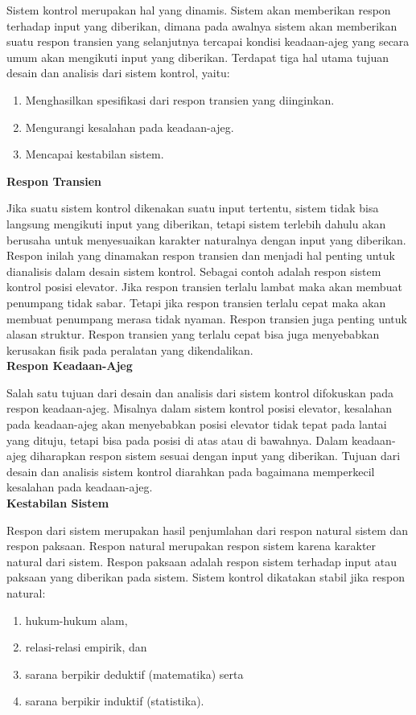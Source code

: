 Sistem kontrol merupakan hal yang dinamis. Sistem akan memberikan respon terhadap input yang diberikan, dimana pada awalnya sistem akan memberikan suatu respon transien yang selanjutnya tercapai kondisi keadaan-ajeg yang secara umum akan mengikuti input yang diberikan. Terdapat tiga hal utama tujuan desain dan analisis dari sistem kontrol, yaitu:

\begin{enumerate}
	\item Menghasilkan spesifikasi dari respon transien yang diinginkan.
	\item Mengurangi kesalahan pada keadaan-ajeg.
	\item Mencapai kestabilan sistem.
\end{enumerate}

\noindent \textbf{Respon Transien}

Jika suatu sistem kontrol dikenakan suatu input tertentu, sistem tidak bisa langsung mengikuti input yang diberikan, tetapi sistem terlebih dahulu akan berusaha untuk menyesuaikan karakter naturalnya dengan input yang diberikan. Respon inilah yang dinamakan respon transien dan menjadi hal penting untuk dianalisis dalam desain sistem kontrol. Sebagai contoh adalah respon sistem kontrol posisi elevator. Jika respon transien terlalu lambat maka akan membuat penumpang tidak sabar. Tetapi jika respon transien terlalu cepat maka akan membuat penumpang merasa tidak nyaman. Respon transien juga penting untuk alasan struktur. Respon transien yang terlalu cepat bisa juga menyebabkan kerusakan fisik pada peralatan yang dikendalikan. \\

\noindent \textbf{Respon Keadaan-Ajeg}

Salah satu tujuan dari desain dan analisis dari sistem kontrol difokuskan pada respon keadaan-ajeg. Misalnya dalam sistem kontrol posisi elevator, kesalahan pada keadaan-ajeg akan menyebabkan posisi elevator tidak tepat pada lantai yang dituju, tetapi bisa pada posisi di atas atau di bawahnya. Dalam keadaan-ajeg diharapkan respon sistem sesuai dengan input yang diberikan. Tujuan dari desain dan analisis sistem kontrol diarahkan pada bagaimana memperkecil kesalahan pada keadaan-ajeg. \\

\noindent \textbf{Kestabilan Sistem}

Respon dari sistem merupakan hasil penjumlahan dari respon natural sistem dan respon paksaan. Respon natural merupakan respon sistem karena karakter natural dari sistem. Respon paksaan adalah respon sistem terhadap input atau paksaan yang diberikan pada sistem.
Sistem kontrol dikatakan stabil jika respon natural:
\begin{enumerate}
	\item hukum-hukum alam, 
	\item relasi-relasi empirik, dan 
	\item sarana berpikir deduktif (matematika) serta 
	\item sarana berpikir induktif (statistika). 
\end{enumerate}

